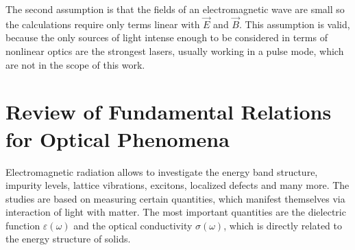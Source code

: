 \documentclass[titlepage,a4paper]{book}
\newcommand{\wciecie}{\quad\phantom{v}}
\begin{document}
The second assumption is that the fields of an electromagnetic wave are small so the calculations require only terms linear with $\vec{E}$ and $\vec{B}$. This assumption is valid, because the only sources of light intense enough to be considered in terms of nonlinear optics are the strongest lasers, usually working in a pulse mode, which are not in the scope of this work. 
 
\section{Review of Fundamental Relations for Optical Phenomena}
\wciecie
Electromagnetic radiation allows to investigate the energy band structure, impurity levels, lattice vibrations, excitons, localized defects and many more. The studies are based on measuring certain quantities, which manifest themselves via interaction of light with matter. The most important quantities are the dielectric function $\varepsilon (\omega)$ and the optical conductivity $\sigma (\omega)$, which is directly related to the energy structure of solids. 
\end{document}
